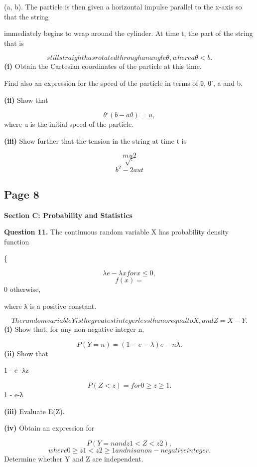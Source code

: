 \documentclass[12pt]{article}
\begin{document}
\begin{flushleft}
(a, b). The particle is then given a horizontal impulse parallel to the x-axis so that the string\par
immediately begins to wrap around the cylinder. At time t, the part of the string that is\par
\[still straight has rotated through an angle θ, where aθ < b.\]
\textbf{(i)} Obtain the Cartesian coordinates of the particle at this time.\par
Find also an expression for the speed of the particle in terms of θ, θ˙, a and b.\par
\textbf{(ii)} Show that\par
\[θ˙(b - aθ) = u ,\]
where u is the initial speed of the particle.\par
\textbf{(iii)} Show further that the tension in the string at time t is\par
\[mu2\]
\[\sqrt .\]
\[b^2 - 2aut\]
\end{flushleft}
\subsection*{Page 8}
\begin{flushleft}
\bigskip\textbf{Section C: Probability and Statistics}\par
\bigskip\textbf{Question 11.} The continuous random variable X has probability density function\par
\{\par
\[λe -λx for x \leq 0,\]
\[f(x) =\]
0 otherwise,\par
where λ is a positive constant.\par
\[The random variable Y is the greatest integer less than or equal to X, and Z = X - Y .\]
\textbf{(i)} Show that, for any non-negative integer n,\par
\[P(Y = n) = (1 - e -λ )e -nλ.\]
\textbf{(ii)} Show that\par
1 - e -λz\par
\[P(Z < z) = for 0 \geq z \geq 1.\]
1 - e-λ\par
\textbf{(iii)} Evaluate E(Z).\par
\textbf{(iv)} Obtain an expression for\par
\[P(Y = n and z 1 < Z < z 2) ,\]
\[where 0 \geq z 1 < z 2 \geq 1 and n is a non-negative integer.\]
Determine whether Y and Z are independent.\par
\end{flushleft}
\end{document}
